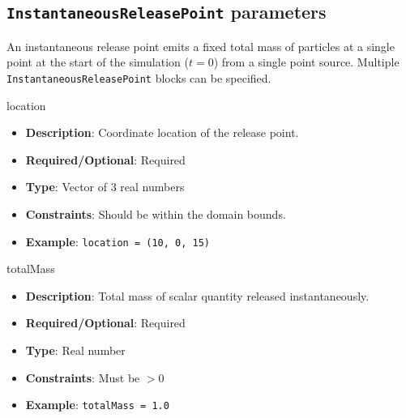 \subsection*{\lstinline!InstantaneousReleasePoint! parameters}
An instantaneous release point emits a fixed total mass of particles at a single point at the start of the simulation ($t = 0$) from a single point source.
Multiple \lstinline!InstantaneousReleasePoint! blocks can be specified.

location
\vspace{\the\parameterListSpacing}
\begin{itemize}
    \item {\bf Description}: Coordinate location of the release point.
    \item {\bf Required/Optional}: Required
    \item {\bf Type}: Vector of 3 real numbers
    \item {\bf Constraints}: Should be within the domain bounds.
    \item {\bf Example}: \lstinline!location = (10, 0, 15)!
\end{itemize}

totalMass
\vspace{\the\parameterListSpacing}
\begin{itemize}
    \item {\bf Description}: Total mass of scalar quantity released instantaneously.
    \item {\bf Required/Optional}: Required
    \item {\bf Type}: Real number
    \item {\bf Constraints}: Must be $> 0$
    \item {\bf Example}: \lstinline!totalMass = 1.0!
\end{itemize}
